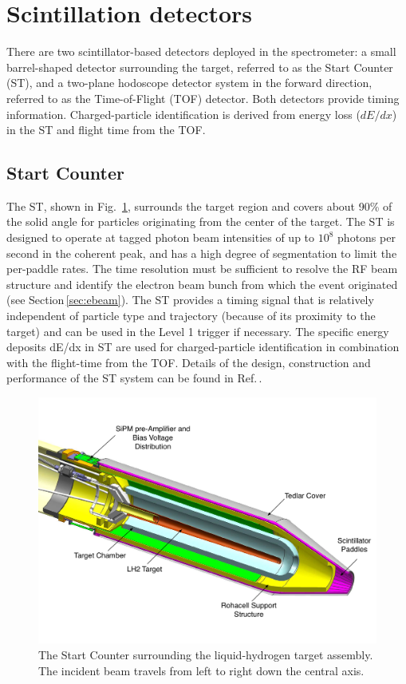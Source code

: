 \section[Scintillation detectors]{Scintillation detectors \label{sec:scintillators}}
There are two scintillator-based detectors deployed in the \gx{} spectrometer: a small barrel-shaped detector surrounding the
target, referred to as the Start Counter (ST), and a two-plane hodoscope detector system in the forward direction, referred to as the
Time-of-Flight (TOF) detector. Both detectors provide timing information. Charged-particle identification is derived from
energy loss ($dE/dx$) in the ST and flight time from the TOF.

\subsection{Start Counter \label{sec:st}}

The ST, shown in Fig.~\ref{fig:st-overview-drawing},
surrounds the target
region and covers about 90\% of the solid angle for particles
originating from the center of the target. The ST is designed to operate
at tagged photon beam intensities of up to $10^8$ photons per second
in the coherent peak, and has a high degree of segmentation to limit
the per-paddle rates. The time resolution must be sufficient to resolve the RF beam structure and identify the electron beam bunch from which the event originated
(see Section\,\ref{sec:ebeam}). The ST provides a timing signal that is relatively independent of particle type and trajectory (because of its proximity to the target) and can be used in the Level 1 trigger if necessary. The specific energy deposits dE/dx in ST are used for charged-particle identification in combination with the flight-time from the TOF.
Details of the design, construction and performance of the ST system can be found in 
Ref.\,\cite{Pooser:2019rhu}.

\begin{figure}[!htb]
\centering
\includegraphics[width=1.0\columnwidth]{figures/start_counter_all.pdf}
\caption{The \gx{} Start Counter surrounding the liquid-hydrogen
  target assembly.  The incident beam travels from left to right down the central
  axis.\label{fig:st-overview-drawing}}
\end{figure}

